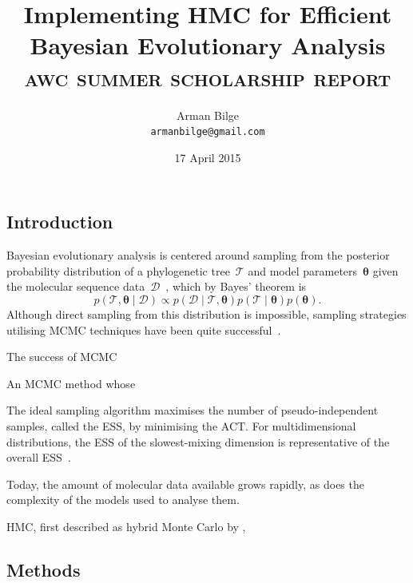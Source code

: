 \documentclass{article}
\title{Implementing \acl{HMC} for Efficient Bayesian Evolutionary Analysis \\
           \Large\textsc{awc summer scholarship report}}
\author{Arman Bilge \\ \texttt{armanbilge@gmail.com}}
\date{17 April 2015}
\renewcommand{\vec}[1]{\ensuremath{\boldsymbol{\mathbf{#1}}}}
\begin{document}
    \maketitle

    \subsection*{Introduction}

    Bayesian evolutionary analysis is centered around sampling from the
        posterior probability distribution of a phylogenetic
        tree~$\mathcal{T}$ and model parameters~$\vec\theta$
        given the molecular sequence data~$\mathcal{D}$~\cite{Bou+14},
        which by Bayes' theorem is
        \begin{equation}
            p\left(\mathcal{T}, \vec\theta \mid \mathcal{D}\right)
                \propto p\left(\mathcal{D} \mid \mathcal{T},\vec\theta\right)
                p\left(\mathcal{T} \mid \vec\theta\right) p\left(\vec\theta\right).
        \end{equation}
    Although direct sampling from this distribution is impossible,
        sampling strategies utilising \ac{MCMC} techniques have been quite
        successful~\cite{RH03,Dru+12,Bou+14}.

    The success of \ac{MCMC}

    An \ac{MCMC} method whose

    The ideal sampling algorithm maximises the number of pseudo-independent
        samples, called the \ac{ESS}, by minimising the \ac{ACT}.
    For multidimensional distributions, the \ac{ESS} of the slowest-mixing
        dimension is representative of the overall \ac{ESS}~\cite{Tho10}.

    Today, the amount of molecular data available grows rapidly, as does the
        complexity of the models used to analyse them.

    \ac{HMC}, first described as hybrid Monte Carlo by \textcite{Dua+87},

    \subsection*{Methods}
\end{document}
